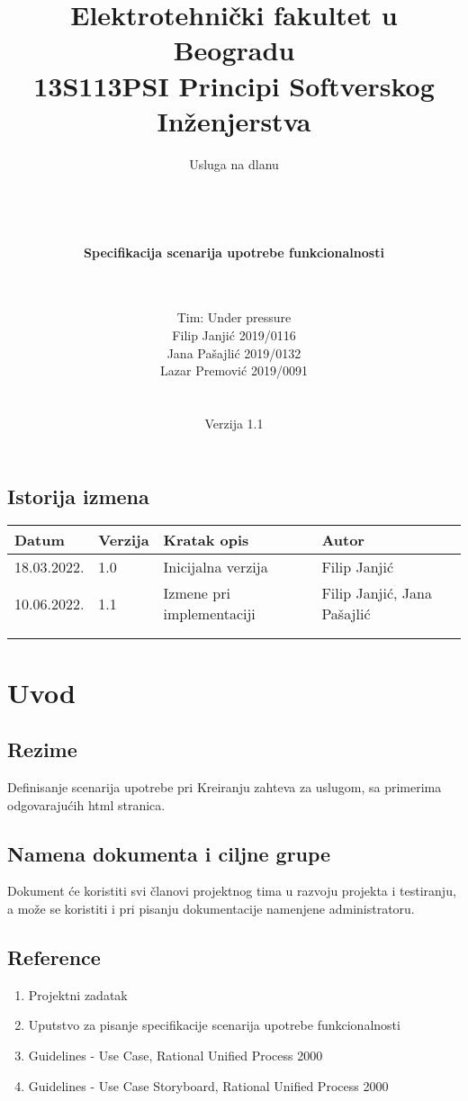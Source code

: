 \documentclass[a4paper,12pt]{report}
\title{\Large Elektrotehnički fakultet u Beogradu \\ 13S113PSI Principi Softverskog Inženjerstva}
\author{\Huge Usluga na dlanu\\ \ \\ \ \\ \ \\ \ \\
	\Large \textbf{Specifikacija scenarija upotrebe funkcionalnosti}\\\Large \textbf{\genitivfunkcionalnosti} \\ \ \\}
\date{\Large   Tim: Under pressure \\ Filip Janjić 2019/0116 \\ Jana Pašajlić 2019/0132 \\ Lazar Premović 2019/0091  \\ \  \\ \  \\
	\large Verzija 1.1}
\newcommand{\dativfunkcionalnosti }{Kreiranju zahteva za uslugom}
\newcommand{\inicijalniautor}{Filip Janjić}
\newcommand{\inicijalnidatum}{18.03.2022.}
\begin{document}
	
	\maketitle
	
	\begin{center}
		\section*{Istorija izmena}
			\begin{tabular}{ |l|l|l|l| }
				\hline
				\textbf{Datum} & \textbf{Verzija} & \textbf{Kratak opis} & \textbf{Autor} \\ 
				\hline
				\inicijalnidatum & 1.0  & Inicijalna verzija & \inicijalniautor \\
				\hline
				10.06.2022. & 1.1 & Izmene pri implementaciji & Filip Janjić, Jana Pašajlić \\
				\hline
				&  &  &  \\
				\hline
				&  &  &  \\
				\hline
			\end{tabular}
	\end{center}
	
	\newpage
	
	\tableofcontents
	
	\newpage
	
	\section{Uvod}
		\subsection{Rezime}
			Definisanje scenarija upotrebe pri \dativfunkcionalnosti, sa primerima odgovarajućih html stranica.
		\subsection{Namena dokumenta i ciljne grupe}
			Dokument će koristiti svi članovi projektnog tima u razvoju projekta i testiranju, a može se koristiti i pri pisanju dokumentacije namenjene administratoru.
		\subsection{Reference}
			\begin{enumerate}
				\item Projektni zadatak
				\item Uputstvo za pisanje specifikacije scenarija upotrebe funkcionalnosti
				\item Guidelines - Use Case, Rational Unified Process 2000
				\item Guidelines - Use Case Storyboard, Rational Unified Process 2000
			\end{enumerate}
\end{document}
